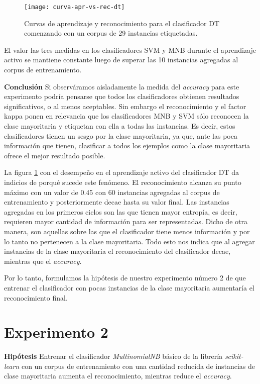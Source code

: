 \begin{figure}[h!]
\centering
\texttt{[image: curva-apr-vs-rec-dt]}
\caption{Curvas de aprendizaje y reconocimiento para el clasificador DT comenzando con un corpus de 29 instancias etiquetadas.}\label{curva-apr-vs-rec-dt}
\end{figure}

El valor las tres medidas en los clasificadores SVM y MNB durante el aprendizaje activo se mantiene constante luego de superar las 10 instancias agregadas al corpus de entrenamiento.

\vspace{3 mm}

\textbf{Conclusión}
Si observáramos aisladamente la medida del \textit{accuracy} para este experimento podría pensarse que todos los clasificadores obtienen resultados significativos, o al menos aceptables. Sin embargo el reconocimiento y el factor kappa ponen en relevancia que los clasificadores MNB y SVM sólo reconocen la clase mayoritaria y etiquetan con ella a todas las instancias. Es decir, estos clasificadores tienen un sesgo por la clase mayoritaria, ya que, ante las poca información que tienen, clasificar a todos los ejemplos como la clase mayoritaria ofrece el mejor resultado posible.

La figura \ref{curva-apr-vs-rec-dt} con el desempeño en el aprendizaje activo del clasificador DT da indicios de porqué sucede este fenómeno. El reconocimiento alcanza su punto máximo con un valor de 0.45 con 60 instancias agregadas al corpus de entrenamiento y posteriormente decae hasta su valor final. Las instancias agregadas en los primeros ciclos son las que tienen mayor entropía, es decir, requieren mayor cantidad de información para ser representadas. Dicho de otra manera, son aquellas sobre las que el clasificador tiene menos información y por lo tanto no pertenecen a la clase mayoritaria. Todo esto nos indica que al agregar instancias de la clase mayoritaria el reconocimiento del clasificador decae, mientras que el \textit{accuracy}.

Por lo tanto, formulamos la hipótesis de nuestro experimento número 2 de que entrenar el clasificador con pocas instancias de la clase mayoritaria aumentaría el reconocimiento final.

\section{Experimento 2}
\vspace{3 mm}
\textbf{Hipótesis} Entrenar el clasificador \textit{MultinomialNB} básico de la librería \textit{scikit-learn} con un corpus de entrenamiento con una cantidad reducida de instancias de clase mayoritaria aumenta el reconocimiento, mientras reduce el \textit{accuracy}.
\vspace{3 mm}


